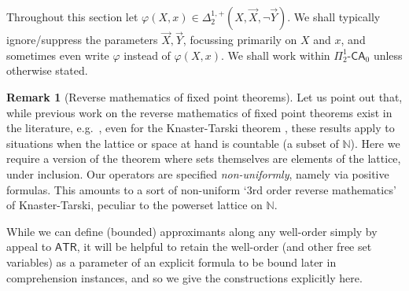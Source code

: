 \documentclass[10pt,a4paper]{amsart}
\theoremstyle{plain}
\theoremstyle{definition}
\newtheorem{remark}[remark]{Remark}
\renewcommand{\phi}{\varphi}
\newcommand{\anupam}[1]{\todo[color=green]{A: #1}}
\renewcommand{\todo}[1]{}
\renewcommand{\anupam}[1]{}
\theoremstyle{plain}
\theoremstyle{definition} %
\newcommand{\Nat}{\mathbb{N}}
\newcommand{\limp}{\to}
\newcommand{\Pin}[2]{\Pi^{#1}_{#2}}
\newcommand{\Din}[2]{\Delta^{#1}_{#2}}
\newcommand{\posDin}[3]{\Din{#1,+}{#2} (#3)}
\newcommand{\posnegDin}[4]{\posDin{#1}{#2}{#3, \lnot #4}}
\newcommand{\CA}{\mathsf{CA}}
\newcommand{\ca}[1]{#1\text{-}\CA}
\newcommand{\PSCA}{\ca{\Pin 1 2 }_0}
\newcommand{\ATR}{\mathsf{ATR}}
\begin{document}

Throughout this section let $\phi(X,x) \in \posnegDin 1 2 {X,\vec X}{\vec Y}$.
We shall typically ignore/suppress the parameters $\vec X, \vec Y$, focussing primarily on $X$ and $x$, and sometimes even write $\phi$ instead of $\phi(X,x)$.
We shall work within $\PSCA$ unless otherwise stated.


\begin{remark}
    [Reverse mathematics of fixed point theorems]
    Let us point out that, while previous work on the reverse mathematics of fixed point theorems exist in the literature, e.g.\ \cite{PengYamazaki17:rev-math-fixed-point-thms-no-kt}, even for the Knaster-Tarski theorem \cite{SatoYamazaki17:rev-math-fixed-point-thms-with-kt}, these results apply to situations when the lattice or space at hand is countable (a subset of $\Nat$).
Here we require a version of the theorem where sets themselves are elements of the lattice, under inclusion.
Our operators are specified \emph{non-uniformly}, namely via positive formulas.
This amounts to a sort of non-uniform `3rd order reverse mathematics' of Knaster-Tarski, peculiar to the powerset lattice on $\Nat$.
\end{remark}




While we can define (bounded) approximants along any well-order simply by appeal to $\ATR$, it will be helpful to retain the well-order (and other free set variables) as a parameter of an explicit formula to be bound later in comprehension instances, and so we give the constructions explicitly here.

\end{document}
